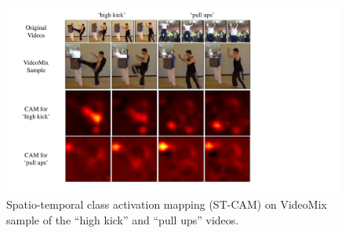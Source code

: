 \begin{figure}[!t]
\centering
\includegraphics[width=0.77\linewidth]{arxiv_videomix/supplementary/figs/cam_supp4.pdf}
\caption{Spatio-temporal class activation mapping (ST-CAM) on VideoMix sample of the ``high kick'' and ``pull ups'' videos.}
\label{supp:cam4}
\end{figure}
